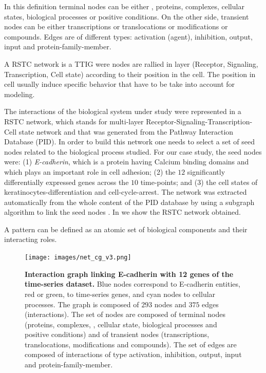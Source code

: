 In this definition terminal nodes can be either , proteins,  complexes, cellular states, biological processes or positive conditions. 
On the other side, transient nodes can be either transcriptions or translocations or modifications or compounds. Edges are of different types:
activation (agent), inhibition, output, input and protein-family-member.

\begin{definition} 
 A RSTC network is a TTIG were nodes are rallied in layer (Receptor, Signaling, Transcription, Cell state) according to their position in the cell. The position in cell 
 usually induce specific behavior that have to be take into account for modeling. 
\end{definition}



The interactions of the biological system under study were represented in
 a RSTC network, which stands for  multi-layer Receptor-Signaling-Transcription-Cell state network and that was generated from the Pathway Interaction Database (PID).
In order to build this network one needs to select a set of seed nodes related to the biological process studied.
For our case study, the seed nodes were:  (1) \emph{E-cadherin}, which is a protein having Calcium binding domains and which plays an important role in cell adhesion;
(2) the $12$ significantly differentially expressed genes across the $10$ time-points; and (3) the cell states of keratinocytes-differentiation and cell-cycle-arrest. 
The network was extracted automatically from the whole content of the PID database by using a subgraph algorithm to link the seed nodes \cite{guziolowski2012automatic}. 
In  we show the RSTC network obtained. 



\begin{definition}[Pattern] \label{def:pattern}

A pattern can be defined as an atomic set of biological components and their interacting roles. 

\end{definition}


\begin{figure}[!p]
 \centering
 \texttt{[image: images/net\_cg\_v3.png]}
\caption{{\bf  Interaction graph linking E-cadherin with 12 genes of the time-series dataset.} Blue nodes correspond to E-cadherin entities, red or green, to time-series genes, 
and cyan nodes to cellular processes. The graph is composed of $293$ nodes and $375$ edges (interactions).
The set of nodes are composed of terminal nodes (proteins, complexes, , cellular state, biological processes and positive conditions) and of transient
nodes (transcriptions, translocations, modifications and compounds). The set of edges are composed of interactions of type activation, inhibition, output, 
input and protein-family-member.} 
 \label{fig:network}
\end{figure}

